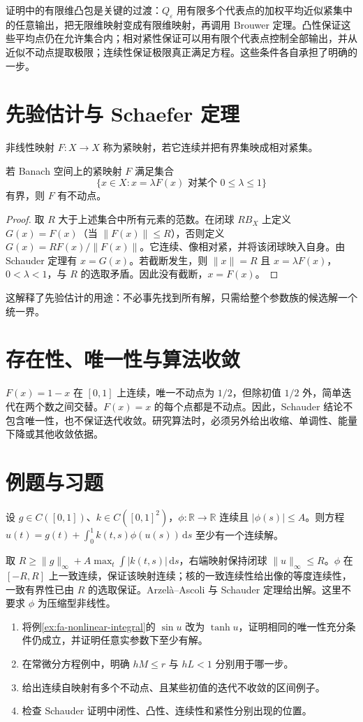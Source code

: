 \documentclass[UTF8,12pt,a4paper,fontset=fandol]{ctexbook}
\begin{document}
证明中的有限维凸包是关键的过渡：$Q_\varepsilon$ 用有限多个代表点的加权平均近似紧集中的任意输出，把无限维映射变成有限维映射，再调用 Brouwer 定理。凸性保证这些平均点仍在允许集合内；相对紧性保证可以用有限个代表点控制全部输出，并从近似不动点提取极限；连续性保证极限真正满足方程。这些条件各自承担了明确的一步。

\section{先验估计与 Schaefer 定理}
非线性映射 $F:X\to X$ 称为紧映射，若它连续并把有界集映成相对紧集。
\begin{theorem}
若 Banach 空间上的紧映射 $F$ 满足集合
\[
 \{x\in X:x=\lambda F(x)\text{ 对某个 }0\leq\lambda\leq1\}
\]
有界，则 $F$ 有不动点。
\end{theorem}
\begin{proof}
取 $R$ 大于上述集合中所有元素的范数。在闭球 $RB_X$ 上定义 $G(x)=F(x)$（当 $\|F(x)\|\leq R$），否则定义 $G(x)=RF(x)/\|F(x)\|$。它连续、像相对紧，并将该闭球映入自身。由 Schauder 定理有 $x=G(x)$。若截断发生，则 $\|x\|=R$ 且 $x=\lambda F(x)$，$0<\lambda<1$，与 $R$ 的选取矛盾。因此没有截断，$x=F(x)$。
\end{proof}
这解释了先验估计的用途：不必事先找到所有解，只需给整个参数族的候选解一个统一界。

\section{存在性、唯一性与算法收敛}
$F(x)=1-x$ 在 $[0,1]$ 上连续，唯一不动点为 $1/2$，但除初值 $1/2$ 外，简单迭代在两个数之间交替。$F(x)=x$ 的每个点都是不动点。因此，Schauder 结论不包含唯一性，也不保证迭代收敛。研究算法时，必须另外给出收缩、单调性、能量下降或其他收敛依据。

\section{例题与习题}
\begin{example}[仅连续非线性的存在性]
设 $g\in C([0,1])$、$k\in C([0,1]^2)$，$\phi:\mathbb R\to\mathbb R$ 连续且 $|\phi(s)|\leq A$。则方程 $u(t)=g(t)+\int_0^1k(t,s)\phi(u(s))\,\mathrm ds$ 至少有一个连续解。
\end{example}
\begin{solve}
取 $R\geq\|g\|_\infty+A\max_t\int|k(t,s)|\,\mathrm ds$，右端映射保持闭球 $\|u\|_\infty\leq R$。$\phi$ 在 $[-R,R]$ 上一致连续，保证该映射连续；核的一致连续性给出像的等度连续性，一致有界性已由 $R$ 的选取保证。Arzelà--Ascoli 与 Schauder 定理给出解。这里不要求 $\phi$ 为压缩型非线性。
\end{solve}
\begin{enumerate}
 \item 将例\ref{ex:fa-nonlinear-integral}的 $\sin u$ 改为 $\tanh u$，证明相同的唯一性充分条件仍成立，并证明任意实参数下至少有解。
 \item 在常微分方程例中，明确 $hM\leq r$ 与 $hL<1$ 分别用于哪一步。
 \item 给出连续自映射有多个不动点、且某些初值的迭代不收敛的区间例子。
 \item 检查 Schauder 证明中闭性、凸性、连续性和紧性分别出现的位置。
\end{enumerate}
\end{document}
